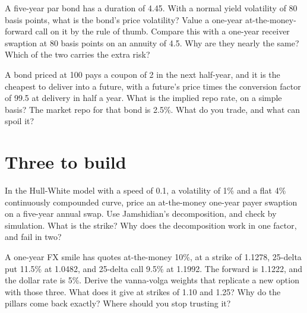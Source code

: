 \begin{question}\label{iq:iv2:rates-and-fx:46}
A five-year par bond has a duration of 4.45. With a normal yield volatility of 80 basis points, what is the bond's price volatility? Value a one-year at-the-money-forward call on it by the rule of thumb. Compare this with a one-year receiver swaption at 80 basis points on an annuity of 4.5. Why are they nearly the same? Which of the two carries the extra risk?
\end{question}

\begin{question}\label{iq:iv2:rates-and-fx:47}
A bond priced at 100 pays a coupon of 2 in the next half-year, and it is the cheapest to deliver into a future, with a future's price times the conversion factor of 99.5 at delivery in half a year. What is the implied repo rate, on a simple basis? The market repo for that bond is 2.5\%. What do you trade, and what can spoil it?
\end{question}

\section{Three to build}

\begin{question}\label{iq:iv2:rates-and-fx:48}
In the Hull-White model with a speed of 0.1, a volatility of 1\% and a flat 4\% continuously compounded curve, price an at-the-money one-year payer swaption on a five-year annual swap. Use Jamshidian's decomposition, and check by simulation. What is the strike? Why does the decomposition work in one factor, and fail in two?
\end{question}

\begin{question}\label{iq:iv2:rates-and-fx:49}
A one-year FX smile has quotes at-the-money 10\%, at a strike of 1.1278, 25-delta put 11.5\% at 1.0482, and 25-delta call 9.5\% at 1.1992. The forward is 1.1222, and the dollar rate is 5\%. Derive the vanna-volga weights that replicate a new option with those three. What does it give at strikes of 1.10 and 1.25? Why do the pillars come back exactly? Where should you stop trusting it?
\end{question}

